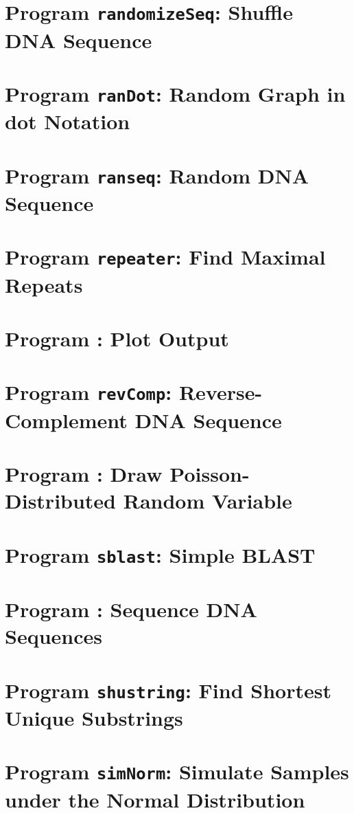\documentclass[a4paper]{report}
\begin{document}
\chapter{Program \texttt{randomizeSeq}: Shuffle DNA
  Sequence}\label{ch:rs}

\chapter{Program \texttt{ranDot}: Random Graph in dot Notation}\label{ch:rd}

\chapter{Program \texttt{ranseq}: Random DNA Sequence}\label{ch:ran}

\chapter{Program \texttt{repeater}: Find Maximal
  Repeats}\label{ch:rep}

\chapter{Program : Plot 
  Output}\label{ch:r2p}

\chapter{Program \texttt{revComp}: Reverse-Complement DNA
  Sequence}\label{ch:rev}

\chapter{Program : Draw Poisson-Distributed Random
  Variable}\label{ch:rpo}

\chapter{Program \texttt{sblast}: Simple BLAST}\label{ch:sb}

\chapter{Program : Sequence DNA Sequences}\label{ch:seq}

\chapter{Program \texttt{shustring}: Find Shortest Unique Substrings}\label{ch:shu}

\chapter{Program \texttt{simNorm}: Simulate Samples under the Normal
  Distribution}\label{ch:sn}

\end{document}
